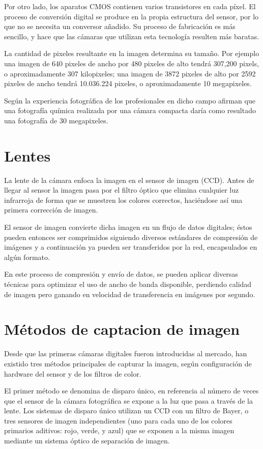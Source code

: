 \documentclass[12pt,a4paper]{report}
\begin{document}
Por otro lado, los aparatos CMOS contienen varios transistores en cada píxel. El
proceso de conversión digital se produce en la propia estructura del sensor, por
lo que no se necesita un conversor añadido. Su proceso de fabricación es más
sencillo, y hace que las cámaras que utilizan esta tecnología resulten más
baratas.

La cantidad de pixeles resultante en la imagen determina su tamaño. Por ejemplo
una imagen de 640 pixeles de ancho por 480 pixeles de alto tendrá 307,200
pixels, o aproximadamente 307 kilopixeles; una imagen de 3872 pixeles de alto
por 2592 pixeles de ancho tendrá 10.036.224 pixeles, o aproximadamente 10
megapixeles.

Según la experiencia fotográfica de los profesionales en dicho campo afirman que
una fotografía química realizada por una cámara compacta daría como resultado
una fotografía de 30 megapixeles.

\section{Lentes}

La lente de la cámara enfoca la imagen en el sensor de imagen
(CCD). Antes de llegar al sensor la imagen pasa por el filtro óptico que
elimina cualquier luz infrarroja de forma que se muestren los colores
correctos, haciéndose así una primera corrección de imagen.

El sensor de imagen convierte dicha imagen en un flujo de datos
digitales; éstos pueden entonces ser comprimidos siguiendo diversos
estándares de compresión de imágenes y a continuación ya pueden
ser transferidos por la red, encapsulados en algún formato.

En este proceso de compresión y envío de datos, se pueden aplicar
diversas técnicas para optimizar el uso de ancho de banda disponible,
perdiendo calidad de imagen pero ganando en velocidad de
transferencia en imágenes por segundo.

\section{Métodos de captacion de imagen}

Desde que las primeras cámaras digitales fueron introducidas al mercado, han
existido tres métodos principales de capturar la imagen, según configuración de
hardware del sensor y de los filtros de color.

El primer método se denomina de disparo único, en referencia al número de veces
que el sensor de la cámara fotográfica se expone a la luz que pasa a través de
la lente. Los sistemas de disparo único utilizan un CCD con un filtro de Bayer,
o tres sensores de imagen independientes (uno para cada uno de los colores
primarios aditivos: rojo, verde, y azul) que se exponen a la misma imagen
mediante un sistema óptico de separación de imagen.
\end{document}
